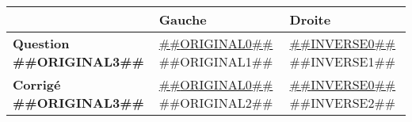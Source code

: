 \documentclass[a4paper,11pt]{article}
\begin{document}
\begin{longtable}{|p{3cm}|p{7.5cm}|p{7.5cm}|}
\hline 
 & Gauche & Droite \\



\hline 
\textbf{Question ##{{ORIGINAL3}}##} & \underline{##{{ORIGINAL0}}##} \newline ##{{ORIGINAL1}}## & \underline{##{{INVERSE0}}##} \newline ##{{INVERSE1}}## \\




\hline 
\textbf{Corrigé ##{{ORIGINAL3}}##} & \underline{##{{ORIGINAL0}}##} \newline ##{{ORIGINAL2}}## & \underline{##{{INVERSE0}}##} \newline ##{{INVERSE2}}## \\




\hline 
\end{longtable} 
\end{document}

